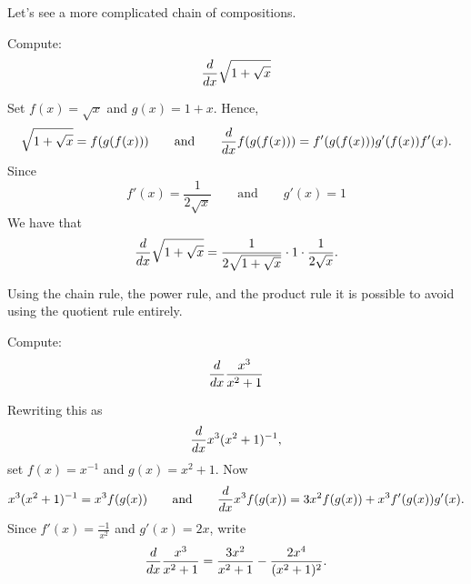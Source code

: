 \documentclass{ximera}
\begin{document}
Let's see a more complicated chain of compositions.

\begin{example}
Compute:
\[
\frac{d}{dx} \sqrt{1+\sqrt{x}}
\]


Set 
$f(x)=\sqrt{x}$ and $g(x)=1+x$. Hence,
\[
\sqrt{1+\sqrt{x}}=f(g(f(x))) \qquad\text{and}\qquad\frac{d}{dx} f(g(f(x))) = f'(g(f(x)))g'(f(x))f'(x).
\]
Since 
\[
f'(x) = \frac{1}{2\sqrt{x}} \qquad\text{and}\qquad g'(x) = 1
\]
We have that
\[
\frac{d}{dx} \sqrt{1+\sqrt{x}} = \frac{1}{2\sqrt{1+\sqrt{x}}}\cdot 1\cdot  \frac{1}{2\sqrt{x}}.
\]
\end{example}

Using the chain rule, the power rule, and the product rule it is
possible to avoid using the quotient rule entirely.

\begin{example}
Compute:
\[
\frac{d}{dx} \frac{x^3}{x^2+1}
\]


Rewriting this as 
\[
\frac{d}{dx} x^3(x^2+1)^{-1}, 
\]
set $f(x) = x^{-1}$ and $g(x) = x^2+1$. Now
\[
x^3(x^2+1)^{-1} = x^3 f(g(x)) \qquad\text{and}\qquad \frac{d}{dx} x^3 f(g(x)) = 3x^2f(g(x))+ x^3 f'(g(x))g'(x).
\]
Since $f'(x) = \frac{-1}{x^2}$ and $g'(x) = 2x$, write
\[
\frac{d}{dx} \frac{x^3}{x^2+1} = \frac{3x^2}{x^2+1}-\frac{2x^4}{(x^2+1)^2}.
\]
\end{example}
\end{document}
